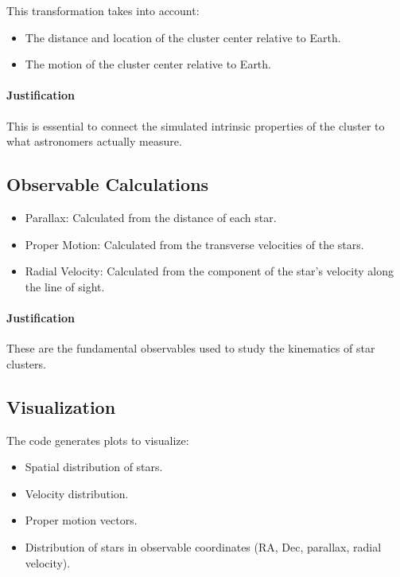 \documentclass{article}
\begin{document}
	This transformation takes into account:
	
	\begin{itemize}
		\item The distance and location of the cluster center relative to Earth. 
		\item The motion of the cluster center relative to Earth. 
	\end{itemize}
	
	\paragraph{Justification}
	
	This is essential to connect the simulated intrinsic properties of the cluster to what astronomers actually measure.
	
	\subsection{Observable Calculations}
	
	\begin{itemize}
		\item Parallax: Calculated from the distance of each star. 
		\item Proper Motion: Calculated from the transverse velocities of the stars. 
		\item Radial Velocity: Calculated from the component of the star's velocity along the line of sight. 
	\end{itemize}
	
	\paragraph{Justification}
	
	These are the fundamental observables used to study the kinematics of star clusters.
	
	\subsection{Visualization}
	
	The code generates plots to visualize: 
	
	\begin{itemize}
		\item Spatial distribution of stars. 
		\item Velocity distribution. 
		\item Proper motion vectors. 
		\item Distribution of stars in observable coordinates (RA, Dec, parallax, radial velocity). 
	\end{itemize}
	
\end{document}
